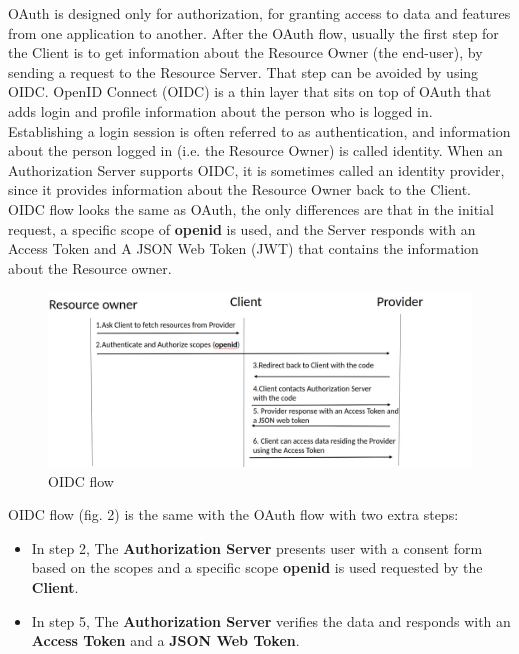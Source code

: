 OAuth is designed only for authorization, for granting access to data and features from one application to another. After the OAuth flow, usually the first step for the Client is to get information about the Resource Owner (the end-user), by sending a request to the Resource Server. That step can be avoided by using OIDC.
OpenID Connect (OIDC) is a thin layer that sits on top of OAuth that adds login and profile information about the person who is logged in. Establishing a login session is often referred to as authentication, and information about the person logged in (i.e. the Resource Owner) is called identity. When an Authorization Server supports OIDC, it is sometimes called an identity provider, since it provides information about the Resource Owner back to the Client. OIDC flow looks the same as OAuth, the only differences are that in the initial request, a specific scope of \textbf{openid} is used, and the Server responds with an Access Token and A JSON Web Token (JWT) that contains the information about the Resource owner.

\begin{figure}[htb]
	\centering
	\includegraphics[scale=0.4]{figures/OIDC.png}
	\caption{OIDC flow}
\end{figure}

OIDC flow (fig. 2) is the same with the OAuth flow with two extra steps:

\begin{itemize}
	
	\item In step 2, The \textbf{Authorization Server} presents user with a consent form based on the scopes and a specific scope \textbf{openid} is used requested by the \textbf{Client}.
	
	\item In step 5, The \textbf{Authorization Server} verifies the data and responds with an \textbf{Access Token} and a \textbf{JSON Web Token}.
\end{itemize}	

